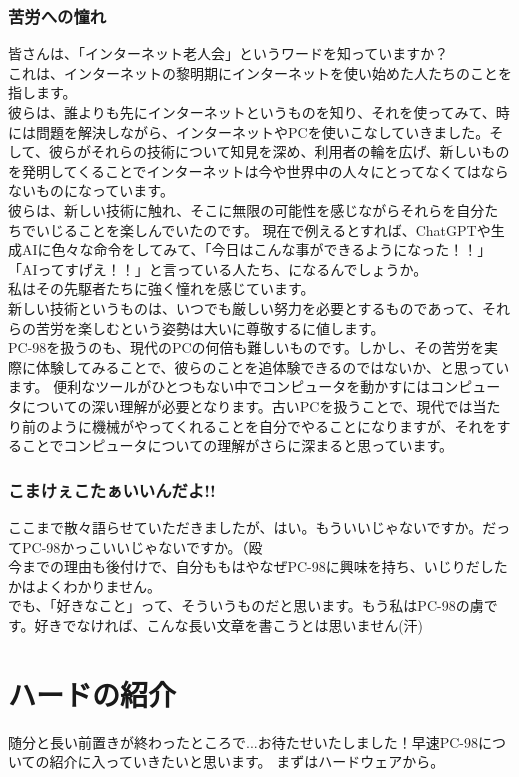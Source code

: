 \documentclass[b5paper,9pt,platex,dvipdfmx]{jsarticle}
\begin{document}
\begin{multicols}{3}
\section[short]{苦労への憧れ}
皆さんは、「インターネット老人会」というワードを知っていますか？\\
これは、インターネットの黎明期にインターネットを使い始めた人たちのことを指します。\\
彼らは、誰よりも先にインターネットというものを知り、それを使ってみて、時には問題を解決しながら、インターネットやPCを使いこなしていきました。そして、彼らがそれらの技術について知見を深め、利用者の輪を広げ、新しいものを発明してくることでインターネットは今や世界中の人々にとってなくてはならないものになっています。\\
彼らは、新しい技術に触れ、そこに無限の可能性を感じながらそれらを自分たちでいじることを楽しんでいたのです。
現在で例えるとすれば、ChatGPTや生成AIに色々な命令をしてみて、「今日はこんな事ができるようになった！！」「AIってすげえ！！」と言っている人たち、になるんでしょうか。\\
私はその先駆者たちに強く憧れを感じています。\\
新しい技術というものは、いつでも厳しい努力を必要とするものであって、それらの苦労を楽しむという姿勢は大いに尊敬するに値します。\\
PC-98を扱うのも、現代のPCの何倍も難しいものです。しかし、その苦労を実際に体験してみることで、彼らのことを追体験できるのではないか、と思っています。
便利なツールがひとつもない中でコンピュータを動かすにはコンピュータについての深い理解が必要となります。古いPCを扱うことで、現代では当たり前のように機械がやってくれることを自分でやることになりますが、それをすることでコンピュータについての理解がさらに深まると思っています。\\
\section[short]{こまけぇこたぁいいんだよ!!}
ここまで散々語らせていただきましたが、はい。もういいじゃないですか。だってPC-98かっこいいじゃないですか。（殴\\
今までの理由も後付けで、自分ももはやなぜPC-98に興味を持ち、いじりだしたかはよくわかりません。\\
でも、「好きなこと」って、そういうものだと思います。もう私はPC-98の虜です。好きでなければ、こんな長い文章を書こうとは思いません(汗)
\part{ハードの紹介}
\setcounter{section}{0}
随分と長い前置きが終わったところで...お待たせいたしました！早速PC-98についての紹介に入っていきたいと思います。
まずはハードウェアから。

\end{multicols}
\end{document}
